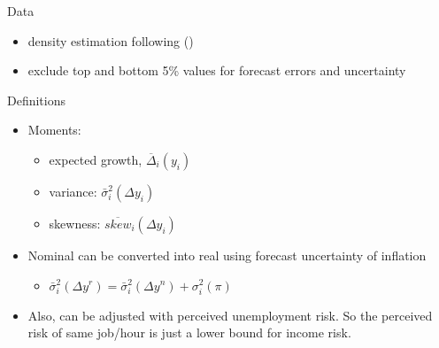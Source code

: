 \documentclass{beamer}
\begin{document}
\begin{frame}{Data}
	\begin{table}
		\centering
		\caption{Survey of Consumer Expectations}
		\label{SCE_data_sum}
	\end{table}
	\begin{itemize}
		\item density estimation following (\cite{engelberg_comparing_2009})
		\item exclude top and bottom 5\% values for forecast errors and uncertainty
	\end{itemize}
\end{frame}


\begin{frame}{Definitions}
	\begin{itemize}
		\item Moments:
		\begin{itemize}
			\item expected growth, $\overline \Delta_i (y_i)$
			\item variance: $\bar \sigma^2_i(\Delta y_i)$
			\item skewness: $\overline {skew}_i(\Delta y_i)$
		\end{itemize}
		\item Nominal can be converted into real using forecast uncertainty of inflation 
		\begin{itemize}
			\item $\bar \sigma_i^2(\Delta y^r) =\bar \sigma_i^2(\Delta y^n) +  \sigma_i^2(\pi)$  
		\end{itemize}
		\item Also, can be adjusted with perceived unemployment risk. So the perceived risk of same job/hour is just a lower bound for income risk. 
	\end{itemize}
\end{frame}
\end{document}
